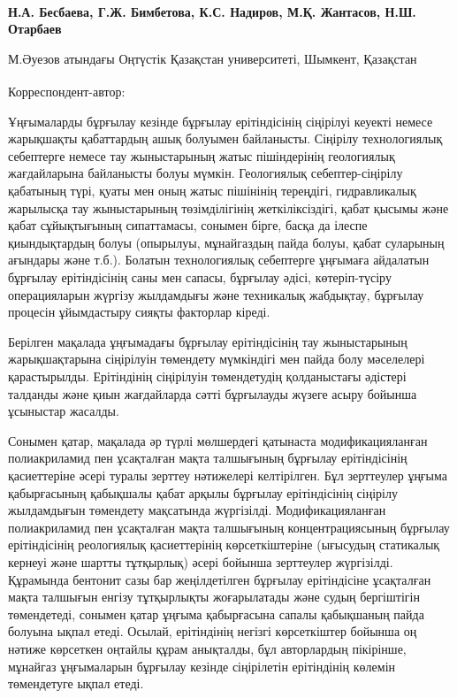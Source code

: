 
\begin{articleheader}

{\bfseries
Н.А. Бесбаева,
Г.Ж. Бимбетова\textsuperscript{\envelope },
К.С. Надиров,
М.Қ. Жантасов,
Н.Ш. Отарбаев
}
\end{articleheader}

\begin{affiliation}
М.Әуезов атындағы Оңтүстік Қазақстан университеті, Шымкент, Қазақстан

\raggedright \textsuperscript{\envelope } Корреспондент-автор: \href{mailto:gulmnaz@mail.ru}{}
\end{affiliation}

Ұңғымаларды бұрғылау кезінде бұрғылау ерітіндісінің сіңірілуі кеуекті
немесе жарықшақты қабаттардың ашық болуымен байланысты. Сіңірілу
технологиялық себептерге немесе тау жыныстарының жатыс пішіндерінің
геологиялық жағдайларына байланысты болуы мүмкін. Геологиялық
себептер-сіңірілу қабатының түрі, қуаты мен оның жатыс пішінінің
тереңдігі, гидравликалық жарылысқа тау жыныстарының төзімділігінің
жеткіліксіздігі, қабат қысымы және қабат сұйықтығының сипаттамасы,
сонымен бірге, басқа да ілеспе қиындықтардың болуы (опырылуы,
мұнайгаздың пайда болуы, қабат суларының ағындары және т.б.). Болатын
технологиялық себептерге ұңғымаға айдалатын бұрғылау ерітіндісінің саны
мен сапасы, бұрғылау әдісі, көтеріп-түсіру операцияларын жүргізу
жылдамдығы және техникалық жабдықтау, бұрғылау процесін ұйымдастыру
сияқты факторлар кіреді.

Берілген мақалада ұңғымадағы бұрғылау ерітіндісінің тау жыныстарының
жарықшақтарына сіңірілуін төмендету мүмкіндігі мен пайда болу мәселелері
қарастырылды. Ерітіндінің сіңірілуін төмендетудің қолданыстағы әдістері
талданды және қиын жағдайларда сәтті бұрғылауды жүзеге асыру бойынша
ұсыныстар жасалды.

Сонымен қатар, мақалада әр түрлі мөлшердегі қатынаста модификацияланған
полиакриламид пен ұсақталған мақта талшығының бұрғылау ерітіндісінің
қасиеттеріне әсері туралы зерттеу нәтижелері келтірілген. Бұл зерттеулер
ұңғыма қабырғасының қабықшалы қабат арқылы бұрғылау ерітіндісінің
сіңірілу жылдамдығын төмендету мақсатында жүргізілді. Модификацияланған
полиакриламид пен ұсақталған мақта талшығының концентрациясының бұрғылау
ерітіндісінің реологиялық қасиеттерінің көрсеткіштеріне (ығысудың
статикалық кернеуі және шартты тұтқырлық) әсері бойынша зерттеулер
жүргізілді. Құрамында бентонит сазы бар жеңілдетілген бұрғылау
ерітіндісіне ұсақталған мақта талшығын енгізу тұтқырлықты жоғарылатады
және судың бергіштігін төмендетеді, сонымен қатар ұңғыма қабырғасына
сапалы қабықшаның пайда болуына ықпал етеді. Осылай, ерітіндінің негізгі
көрсеткіштер бойынша оң нәтиже көрсеткен оңтайлы құрам анықталды, бұл
авторлардың пікірінше, мұнайгаз ұңғымаларын бұрғылау кезінде сіңірілетін
ерітіндінің көлемін төмендетуге ықпал етеді.

